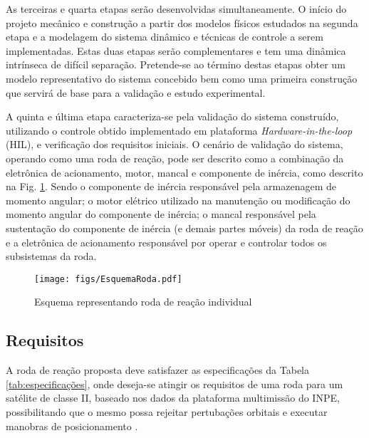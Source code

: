 As terceiras e quarta etapas serão desenvolvidas simultaneamente. O início do projeto mecânico e construção a partir dos modelos físicos estudados na segunda etapa e a modelagem do sistema dinâmico e técnicas de controle a serem implementadas. Estas duas etapas serão complementares e tem uma dinâmica intrínseca de difícil separação. Pretende-se ao término destas etapas obter um modelo representativo do sistema concebido bem como uma primeira construção que servirá de base para a validação e estudo experimental.
	
A quinta e última etapa caracteriza-se pela validação do sistema construído, utilizando o controle obtido implementado em plataforma \textit{Hardware-in-the-loop} (HIL), e verificação dos requisitos iniciais. O cenário de validação do sistema, operando como uma roda de reação,  pode ser descrito como a combinação da eletrônica de acionamento, motor, mancal e componente de inércia, como descrito na Fig. \ref{fig:EsquemaRoda}. Sendo o componente de inércia responsável pela armazenagem de momento angular; o motor elétrico utilizado na manutenção ou modificação do momento angular do componente de inércia; o mancal responsável pela sustentação do componente de inércia (e demais partes móveis) da roda de reação e a eletrônica de acionamento responsável por operar e controlar todos os subsistemas da roda. 

\begin{figure}[hb!] 
	\centering
		\texttt{[image: figs/EsquemaRoda.pdf]}
	\caption{Esquema representando roda de reação individual}
	\label{fig:EsquemaRoda}
\end{figure}


\subsection{Requisitos} \label{sec:esp}

A roda de reação proposta deve satisfazer as especificações da Tabela \ref{tab:especificações}, onde deseja-se atingir os requisitos de uma roda para um satélite de classe II, baseado nos dados da plataforma multimissão do INPE, possibilitando que o mesmo possa rejeitar pertubações orbitais e executar manobras de posicionamento \cite{junior2005estudo}.

